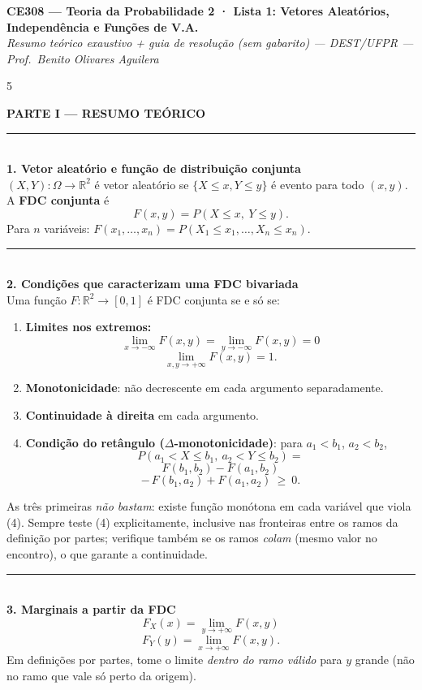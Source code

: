 \documentclass[a4paper,8pt]{extarticle}
\newcommand{\tit}[1]{\vspace{2pt}\textcolor{azul}{\rule{\linewidth}{0.6pt}}\\[1pt]\textbf{\textcolor{azul}{#1}}\\[1pt]}
\newcommand{\Rr}{\mathbb{R}}
\begin{document}
\raggedright
\footnotesize

\begin{center}
{\normalsize\bfseries\color{azul} CE308 — Teoria da Probabilidade 2 · Lista 1: Vetores Aleatórios, Independência e Funções de V.A.}\\[1pt]
{\scriptsize\itshape Resumo teórico exaustivo + guia de resolução (sem gabarito) — DEST/UFPR — Prof.\ Benito Olivares Aguilera}
\end{center}
\vspace{-4pt}

\begin{multicols*}{5}
\scriptsize

\begin{center}\colorbox{cinza}{\parbox{0.94\linewidth}{\centering\bfseries\color{azul} PARTE I — RESUMO TEÓRICO}}\end{center}

\tit{1. Vetor aleatório e função de distribuição conjunta}
$(X,Y):\Omega\to\Rr^2$ é vetor aleatório se $\{X\le x, Y\le y\}$ é evento para todo $(x,y)$. A \textbf{FDC conjunta} é
\[F(x,y)=P(X\le x,\ Y\le y).\]
Para $n$ variáveis: $F(x_1,\dots,x_n)=P(X_1\le x_1,\dots,X_n\le x_n)$.

\tit{2. Condições que caracterizam uma FDC bivariada}
Uma função $F:\Rr^2\to[0,1]$ é FDC conjunta se e só se:
\begin{enumerate}
\item \textbf{Limites nos extremos:}
\[\lim_{x\to-\infty}F(x,y)=\lim_{y\to-\infty}F(x,y)=0\]
\[\lim_{x,y\to+\infty}F(x,y)=1 .\]
\item \textbf{Monotonicidade}: não decrescente em cada argumento separadamente.
\item \textbf{Continuidade à direita} em cada argumento.
\item \textbf{Condição do retângulo ($\Delta$-monotonicidade)}: para $a_1<b_1$, $a_2<b_2$,
\[P(a_1<X\le b_1,\ a_2<Y\le b_2)=\]
\[F(b_1,b_2)-F(a_1,b_2)\]
\[-\,F(b_1,a_2)+F(a_1,a_2)\ \ge\ 0 .\]
\end{enumerate}
As três primeiras \emph{não bastam}: existe função monótona em cada variável que viola (4). Sempre teste (4) explicitamente, inclusive nas fronteiras entre os ramos da definição por partes; verifique também se os ramos \emph{colam} (mesmo valor no encontro), o que garante a continuidade.

\tit{3. Marginais a partir da FDC}
\[F_X(x)=\lim_{y\to+\infty}F(x,y)\]
\[F_Y(y)=\lim_{x\to+\infty}F(x,y).\]
Em definições por partes, tome o limite \emph{dentro do ramo válido} para $y$ grande (não no ramo que vale só perto da origem).


\end{multicols*}
\end{document}
